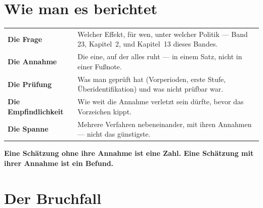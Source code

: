 \section{Wie man es berichtet}

\begin{merksatz}
\begin{center}
{\small
\renewcommand{\arraystretch}{1.52}
\begin{tabular}{@{}P{2.8cm}P{5.8cm}@{}}
\toprule
\textbf{Die Frage} & Welcher Effekt, für wen, unter welcher Politik --- Band 23, Kapitel~2, und Kapitel~13 dieses Bandes.\\
\textbf{Die Annahme} & Die eine, auf der alles ruht --- in einem Satz, nicht in einer Fußnote.\\
\textbf{Die Prüfung} & Was man geprüft hat (Vorperioden, erste Stufe, Überidentifikation) und was nicht prüfbar war.\\
\textbf{Die Empfindlichkeit} & Wie weit die Annahme verletzt sein dürfte, bevor das Vorzeichen kippt.\\
\textbf{Die Spanne} & Mehrere Verfahren nebeneinander, mit ihren Annahmen --- nicht das günstigste.\\
\bottomrule
\end{tabular}}
\end{center}

\begin{center}
\begin{minipage}{0.9\textwidth}
\textbf{Eine Schätzung ohne ihre Annahme ist eine Zahl. Eine Schätzung mit ihrer Annahme ist ein Befund.}
\end{minipage}
\end{center}

\begin{center}
\begin{minipage}{0.88\textwidth}
\end{minipage}
\end{center}
\end{merksatz}

\section{Der Bruchfall}

